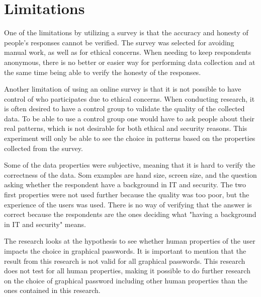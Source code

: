   \section{Limitations}\label{sec:limitations}
    One of the limitations by utilizing a survey is that the accuracy and honesty of people's responses cannot be verified. The survey was selected for avoiding manual work, as well as for ethical concerns. When needing to keep respondents anonymous, there is no better or easier way for performing data collection and at the same time being able to verify the honesty of the responses. 

    Another limitation of using an online survey is that it is not possible to have control of who participates due to ethical concerns. When conducting research, it is often desired to have a control group to validate the quality of the collected data. To be able to use a control group one would have to ask people about their real patterns, which is not desirable for both ethical and security reasons. This experiment will only be able to see the choice in patterns based on the properties collected from the survey.

    Some of the data properties were subjective, meaning that it is hard to verify the correctness of the data. Som examples are hand size, screen size, and the question asking whether the respondent have a background in IT and security. The two first properties were not used further because the quality was too poor, but the experience of the users was used. There is no way of verifying that the answer is correct because the respondents are the ones deciding what "having a background in IT and security" means. 

    The research looks at the hypothesis to see whether human properties of the user impacts the choice in graphical passwords. It is important to mention that the result from this research is not valid for all graphical passwords. This research does not test for all human properties, making it possible to do further research on the choice of graphical password including other human properties than the ones contained in this research. 

  \clearpage
\mbox{}
\newpage

